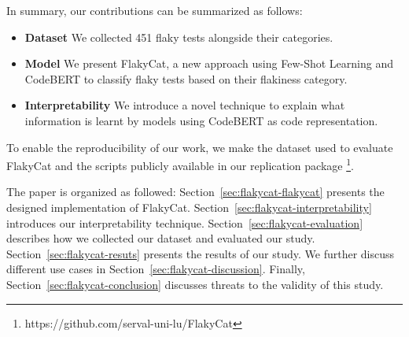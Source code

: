 In summary, our contributions can be summarized as follows:
 \begin{itemize}
    \item \textbf{Dataset} We collected 451 flaky tests alongside their categories. 
     \item \textbf{Model} We present FlakyCat, a new approach using Few-Shot Learning and CodeBERT to classify flaky tests based on their flakiness category. 
     \item \textbf{Interpretability} We introduce a novel technique to explain what information is learnt by models using CodeBERT as code representation.
 \end{itemize}

To enable the reproducibility of our work, we make the dataset used to evaluate FlakyCat and the scripts publicly available in our replication package \footnote{https://github.com/serval-uni-lu/FlakyCat}.

The paper is organized as followed: Section~\ref{sec:flakycat-flakycat} presents the designed implementation of FlakyCat. Section~\ref{sec:flakycat-interpretability} introduces our interpretability technique. Section~\ref{sec:flakycat-evaluation} describes how we collected our dataset and evaluated our study. Section~\ref{sec:flakycat-resuts} presents the results of our study. We further discuss different use cases in Section~\ref{sec:flakycat-discussion}. Finally, Section~\ref{sec:flakycat-conclusion} discusses threats to the validity of this study.